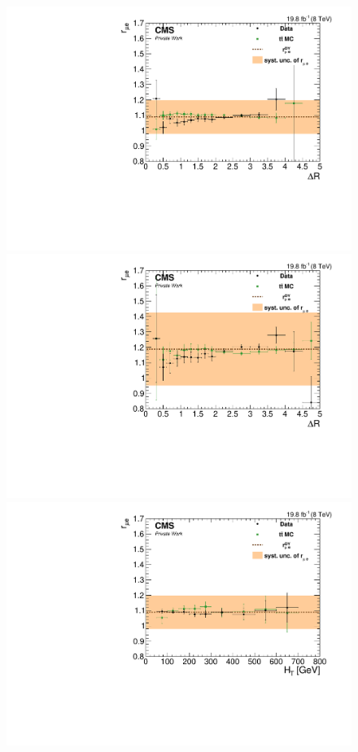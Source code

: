 \begin{figure}[htbp]
\centering
\begin{minipage}[t]{0.49\textwidth}
  \includegraphics[width=\textwidth]{plots/BG/rmue/8TeVrRatioDataVsMCControl_deltaR_Central_Full2012.pdf}
\end{minipage}
\begin{minipage}[t]{0.49\textwidth}
\includegraphics[width=\textwidth]{plots/BG/rmue/8TeVrRatioDataVsMCControl_deltaR_Forward_Full2012.pdf}
\end{minipage}
\begin{minipage}[t]{0.49\textwidth}
  \includegraphics[width=\textwidth]{plots/BG/rmue/8TeVrRatioDataVsMCControl_ht_Central_Full2012.pdf}

\end{minipage}
\end{figure}
